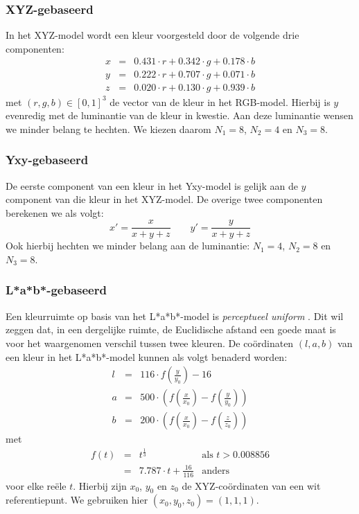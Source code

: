 \subsubsection{XYZ-gebaseerd}

In het XYZ-model wordt een kleur voorgesteld door de volgende drie componenten:
$$
\begin{array}{rcl}
x & = & 0.431 \cdot r+0.342 \cdot g+0.178 \cdot b \\
y & = & 0.222 \cdot r+0.707 \cdot g+0.071 \cdot b \\
z & = & 0.020 \cdot r+0.130 \cdot g+0.939 \cdot b
\end{array}
$$
met $(r,g,b) \in [0,1]^3$ de vector van de kleur in het RGB-model. 
Hierbij is $y$ evenredig met de luminantie van de kleur in kwestie. Aan deze luminantie wensen
we minder belang te hechten. We kiezen daarom $N_1=8$, $N_2=4$ en $N_3=8$.

\subsubsection{Yxy-gebaseerd}

De eerste component van een kleur in het Yxy-model is gelijk aan de $y$ component
van die kleur in het XYZ-model. De overige twee componenten berekenen we als volgt:
$$
x' = \frac{x}{x+y+z} \qquad
y' = \frac{y}{x+y+z}
$$
Ook hierbij hechten we minder belang aan de luminantie: $N_1=4$, $N_2=8$ en $N_3=8$.

\subsubsection{L*a*b*-gebaseerd}

Een kleurruimte op basis van het L*a*b*-model is \emph{perceptueel uniform} \cite{sharma:digital_color_imaging}. Dit wil zeggen
dat, in een dergelijke ruimte, de Euclidische afstand een goede maat is voor het waargenomen
verschil tussen twee kleuren. De co\"ordinaten $(l,a,b)$ van een kleur in het L*a*b*-model
kunnen als volgt benaderd worden:
$$
\begin{array}{rcl}
l & = & 116 \cdot f(\frac{y}{y_0}) - 16 \\[5pt]
a & = & 500 \cdot \left(f(\frac{x}{x_0}) - f(\frac{y}{y_0})\right) \\[5pt]
b & = & 200 \cdot \left(f(\frac{x}{x_0}) - f(\frac{z}{z_0})\right)
\end{array}
$$ 
met 
$$
\begin{array}{rcll}
f(t) & = & t^\frac{1}{3} & \textrm{als } t > 0.008856 \\
	 & = & 7.787 \cdot t + \frac{16}{116} & \textrm{anders}
\end{array}
$$
voor elke re\"ele $t$.
Hierbij zijn $x_0$, $y_0$ en $z_0$ de XYZ-co\"ordinaten van een wit referentiepunt. We gebruiken
hier $(x_0,y_0,z_0)=(1,1,1)$. 


